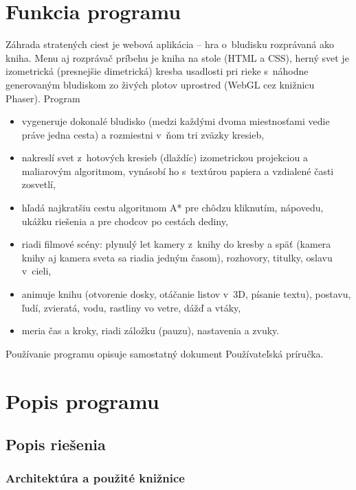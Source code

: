 \documentclass[11pt, a4paper]{article}
\begin{document}
\titulnastrana
\obsah

\section{Funkcia programu}

Záhrada stratených ciest je webová aplikácia – hra o~bludisku rozprávaná ako kniha. Menu aj
rozprávač príbehu je kniha na stole (HTML a CSS), herný svet je izometrická (presnejšie
dimetrická) kresba usadlosti pri rieke s~náhodne generovaným bludiskom zo živých plotov
uprostred (WebGL cez knižnicu Phaser). Program
\begin{itemize}
  \item vygeneruje dokonalé bludisko (medzi každými dvoma miestnosťami vedie práve jedna cesta)
    a rozmiestni v~ňom tri zväzky kresieb,
  \item nakreslí svet z~hotových kresieb (dlaždíc) izometrickou projekciou a maliarovým algoritmom,
    vynásobí ho s~textúrou papiera a vzdialené časti zosvetlí,
  \item hľadá najkratšiu cestu algoritmom A* pre chôdzu kliknutím, nápovedu, ukážku riešenia
    a pre chodcov po cestách dediny,
  \item riadi filmové scény: plynulý let kamery z~knihy do kresby a späť (kamera knihy aj kamera
    sveta sa riadia jedným časom), rozhovory, titulky, oslavu v~cieli,
  \item animuje knihu (otvorenie dosky, otáčanie listov v~3D, písanie textu), postavu, ľudí,
    zvieratá, vodu, rastliny vo vetre, dážď a vtáky,
  \item meria čas a kroky, riadi záložku (pauzu), nastavenia a zvuky.
\end{itemize}
Používanie programu opisuje samostatný dokument Používateľská príručka.

\section{Popis programu}

\subsection{Popis riešenia}

\subsubsection{Architektúra a použité knižnice}
\end{document}
